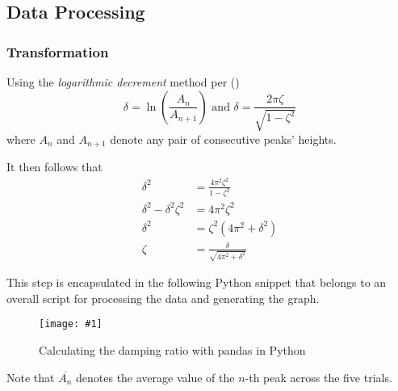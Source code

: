 \documentclass[a4paper,12pt]{article}
\newcommand{\img}[4]{\begin{center}
  \begin{figure}[H]
    \centering
    \texttt{[image: \#1]}
    \caption{#3}
    \label{fig:#4}
  \end{figure}
\end{center}}
\newcommand{\paren}[1]{\left(#1\right)}
\begin{document}
\pagebreak

\subsection{Data Processing}

\subsubsection{Transformation}

Using the \textit{logarithmic decrement} method per  (\citeyear{inman_2008_engineering})
$$\delta = \ln\paren{\frac{A_n}{A_{n+1}}} \text{ and } \delta = \frac{2\pi \zeta}{\sqrt{1 - \zeta^2}}$$ where $A_n$ and $A_{n + 1}$ denote any pair of consecutive peaks' heights.

\noindent It then follows that
\begin{align*}
  \delta^2                   & = \frac{4\pi^2 \zeta^2}{1 - \zeta^2}      \\
  \delta^2 - \delta^2\zeta^2 & = 4\pi^2\zeta^2                           \\
  \delta^2                   & = \zeta^2\paren{4\pi^2 + \delta^2}        \\
  \zeta                      & = \frac{\delta}{\sqrt{4\pi^2 + \delta^2}}
\end{align*}

This step is encapsulated in the following Python snippet that belongs to an overall script for processing the data and generating the graph.

\img{figs/code/damping.png}{0.8}{Calculating the damping ratio with pandas in Python}{damping_code}
\noindent Note that $\overline{A_n}$ denotes the average value of the $n$-th peak across the five trials.
\end{document}
